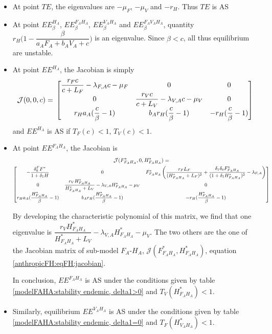 \documentclass{article}
\newcommand{\lfa}{\lambda_{F, A}}
\newcommand{\lva}{\lambda_{V, A}}
\newcommand{\df}{\delta_0^F}
\begin{document}
\begin{itemize}
 \item At point $TE$, the eigenvalues are $-\mu_F$, $-\mu_V$ and $-r_H$. Thus $TE$ is AS
 \item At point $EE^{H_A}_\beta$, $EE^{F_AH_A}_\beta$, $EE^{V_AH_A}_\beta$ and $EE^{F_AV_AH_A}_\beta$, quantity $r_H \Big(1 - \dfrac{\beta}{a_A F_A + b_A V_A + c} \Big)$ is an eigenvalue. Since $\beta < c$, all thus equilibrium are unstable.
 \item At point $EE^{H_A}$, the Jacobian is simply
$$
\mathcal{J}(0,0,c) = \\
\begin{bmatrix}
\dfrac{r_F c}{c+L_F} - \lfa c - \mu_F & 0 & 0\\
0 & \dfrac{r_V c}{c+L_V} - \lva c - \mu_V & 0 \\
r_H a_A (\dfrac{c}{\beta}-1) & b_A r_H (\dfrac{c}{\beta}-1) & -r_H (\dfrac{c}{\beta}-1)
\end{bmatrix}
$$
and $EE^{H_A}$ is AS if $T_F(c) < 1$, $T_V(c) < 1$.

\item At point $EE^{F_AH_A}$, the Jacobian is
\begin{multline}
\mathcal{J}(F^*_{F_AH_A},0,H^*_{F_AH_A}) = \\
{\small
\begin{bmatrix}
- \dfrac{\df F^*}{1 + \delta_1 H} & 0 & F^*_{F_AH_A} \left(\dfrac{r_F L_F}{(H^*_{F_AH_A} + L_F)^2} + \dfrac{\delta_1 \delta_0 F^*_{F_AH_A}}{(1 + \delta_1 H^*_{F_AH_A})^2} - \lfa \right)\\
0 & \dfrac{r_V H^*_{F_AH_A}}{H^*_{F_AH_A}+L_V} - \lva H^*_{F_AH_A} - \mu_V & 0 \\
r_H a_A (\dfrac{H^*_{F_AH_A}}{\beta}-1) & b_A r_H (\dfrac{H^*_{F_AH_A}}{\beta}-1) & - r_H(\dfrac{H^*_{F_AH_A}}{\beta}-1)
\end{bmatrix}}
\end{multline}

By developing the characteristic polynomial of this matrix, we find that one eigenvalue is $\dfrac{r_V H^*_{F_AH_A}}{H^*_{F_AH_A}+L_V} - \lva H^*_{F_AH_A} - \mu_V$. The two others are the one of the Jacobian matrix of sub-model $F_A$-$H_A$, $\mathcal{J}(F^*_{F_AH_A}, H^*_{F_AH_A})$, equation \eqref{anthropicFH:eqFH:jacobian}.

In conclusion, $EE^{F_AH_A}$ is AS under the conditions given by table \ref{modelFAHA:stability endemic, delta1>0} and $T_V(H^*_{F_AH_A}) < 1$.

\item Similarly, equilibrium $EE^{V_AH_A}$ is AS under the conditions given by table \ref{modelFAHA:stability endemic, delta1=0} and $T_F(H^*_{V_AH_A})<1$.



\end{itemize}
\end{document}
